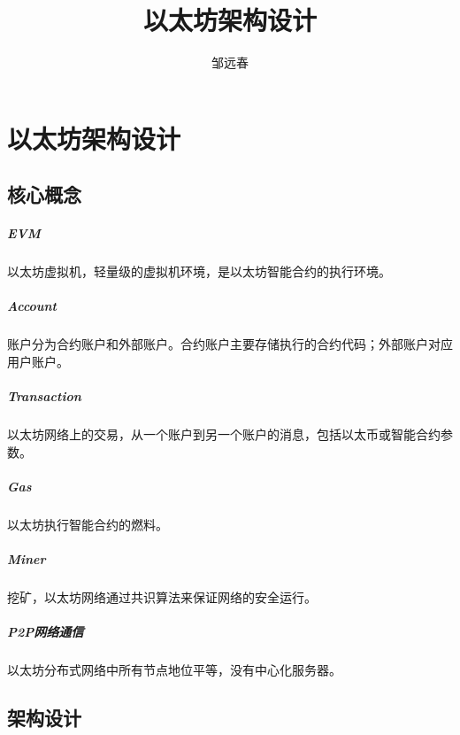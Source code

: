 \documentclass[UTF8]{ctexart}
\title{以太坊架构设计}
\author{邹远春}
\date{}
\begin{document}
\maketitle
\else
\chapter{以太坊架构设计}
\fi
\section{核心概念}

\paragraph{EVM}
以太坊虚拟机，轻量级的虚拟机环境，是以太坊智能合约的执行环境。

\paragraph{Account}

账户分为合约账户和外部账户。合约账户主要存储执行的合约代码；外部账户对应用户账户。

\paragraph{Transaction}

以太坊网络上的交易，从一个账户到另一个账户的消息，包括以太币或智能合约参数。

\paragraph{Gas}

以太坊执行智能合约的燃料。

\paragraph{Miner}
挖矿，以太坊网络通过共识算法来保证网络的安全运行。

\paragraph{P2P网络通信}
以太坊分布式网络中所有节点地位平等，没有中心化服务器。

\section{架构设计}
\end{document}
